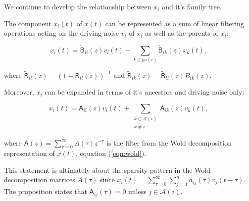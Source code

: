 \documentclass[12pt]{article}
\def\B{\mathsf{B}}  %
\def\wtB{\widetilde{\B}}  %
\def\A{\mathsf{A}}  %
\newcommand{\pa}[1]{pa(#1)}  %
\newcommand{\anc}[1]{\mathcal{A}(#1)}  %
\newcommand{\ancn}[2]{\mathcal{A}_{#1}(#2)}  %
\newcommand{\gpn}[2]{gp_{#1}(#2)}  %
\begin{document}
We continue to develop the relationship between $x_i$ and it's family tree.

\begin{proposition}
  \label{prop:parent_expanding}
  The component $x_i(t)$ of $x(t)$ can be represented as a sum of
  linear filtering operations acting on the driving noise $v_i$ of
  $x_i$ as well as the parents of $x_i$:

  \begin{equation}
    x_i(t) = \wtB_{ii}(z)v_i(t) + \sum_{k \in \pa{i}}\wtB_{ik}(z)x_k(t),
  \end{equation}

  where $\wtB_{ii}(z) = (1 - \B_{ii}(z))^{-1}$ and
  $\wtB_{ik}(z) = \wtB_{ii}(z) B_{ik}(z)$.

  Moreover, $x_i$ can be expanded in terms of it's ancestors and
  driving noise only:

  \begin{equation}
    \label{eqn:ancestor_expansion}
    x_i(t) = \A_{ii}(z)v_i(t) + \sum_{\substack{k \in \anc{i} \\ k \ne i}}\A_{ik}(z)v_k(t),
  \end{equation}

  where $\A(z) = \sum_{\tau = 0}^\infty A(\tau)z^{-\tau}$ is the filter from
  the Wold decomposition representation of $x(t)$, equation
  (\ref{eqn:wold}).
\end{proposition}

This statement is ultimately about the sparsity pattern in the Wold
decomposition matrices $A(\tau)$ since
$x_i(t) = \sum_{\tau = 0}^\infty \sum_{j = 1}^n a_{ij}(\tau)v_j(t -
\tau)$.  The proposition states that $\A_{ij}(\tau) = 0$ unless
$j \in \anc{i}$.



\end{document}
